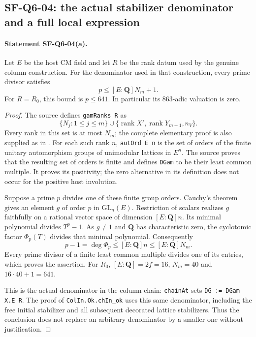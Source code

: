 \documentclass[11pt,a4paper]{article}
\theoremstyle{definition}
\theoremstyle{remark}
\begin{document}
\subsection{SF-Q6-04: the actual stabilizer denominator and a full local expression}

\paragraph{Statement SF-Q6-04(a).}
Let $E$ be the host CM field and let $R$ be the rank datum used by
the genuine column construction.  For the denominator
 used in that construction,
every prime divisor satisfies
\[
 p\le [E:\mathbf Q]N_m+1.
\]
For $R=R_0$, this bound is $p\le641$.  In particular its
$863$-adic valuation is zero.

\begin{proof}
The source  defines
\texttt{gamRanks R} as
\[
 \{N_j:1\le j\le m\}\cup
 \{\operatorname{rank}X',\operatorname{rank}Y_{m-1},n_V\}.
\]
Every rank in this set is at most $N_m$; the complete elementary
proof is also supplied as  in
.
For each such rank $n$, \texttt{autOrd E n} is the set of orders
of the finite unitary automorphism groups of unimodular lattices
in $E^n$.  The source proves that the resulting set of orders is
finite and defines \texttt{DGam} to be their least common multiple.
It proves its positivity; the zero alternative in its definition
does not occur for the positive host involution.

Suppose a prime $p$ divides one of these finite group orders.
Cauchy's theorem gives an element $g$ of order $p$ in
$\mathrm{GL}_n(E)$.  Restriction of scalars realizes $g$ faithfully
on a rational vector space of dimension $[E:\mathbf Q]n$.
Its minimal polynomial divides $T^p-1$.  As $g\ne1$ and
$\mathbf Q$ has characteristic zero, the cyclotomic factor
$\Phi_p(T)$ divides that minimal polynomial.  Consequently
\[
 p-1=\deg\Phi_p\le [E:\mathbf Q]n\le[E:\mathbf Q]N_m.
\]
Every prime divisor of a finite least common multiple divides
one of its entries, which proves the assertion.  For $R_0$,
$[E:\mathbf Q]=2f=16$, $N_m=40$ and $16\cdot40+1=641$.

This is the actual denominator in the column chain:
\texttt{chainAt} sets \texttt{DG := DGam X.E R}.
The proof of \texttt{ColIn.Ok.chIn\_ok} uses this same denominator,
including the free initial stabilizer and all subsequent decorated
lattice stabilizers.  Thus the conclusion does not replace an
arbitrary denominator by a smaller one without justification.
\end{proof}
\end{document}
